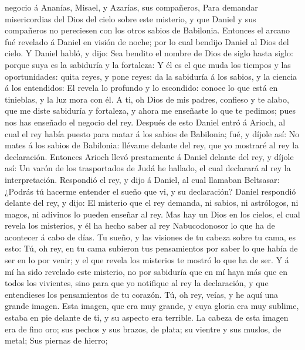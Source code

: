 negocio á Ananías, Misael, y Azarías, sus compañeros, 
Para demandar misericordias del Dios del cielo sobre este misterio, y
que Daniel y sus compañeros no pereciesen con los otros sabios de
Babilonia.  Entonces el arcano fué revelado á Daniel en
visión de noche; por lo cual bendijo Daniel al Dios del cielo.
 Y Daniel habló, y dijo: Sea bendito el nombre de Dios de
siglo hasta siglo: porque suya es la sabiduría y la fortaleza:
 Y él es el que muda los tiempos y las oportunidades:
quita reyes, y pone reyes: da la sabiduría á los sabios, y la ciencia á
los entendidos:  El revela lo profundo y lo escondido:
conoce lo que está en tinieblas, y la luz mora con él.  A
ti, oh Dios de mis padres, confieso y te alabo, que me diste sabiduría y
fortaleza, y ahora me enseñaste lo que te pedimos; pues nos has enseñado
el negocio del rey.  Después de esto Daniel entró á
Arioch, al cual el rey había puesto para matar á los sabios de
Babilonia; fué, y díjole así: No mates á los sabios de Babilonia:
llévame delante del rey, que yo mostraré al rey la declaración.
 Entonces Arioch llevó prestamente á Daniel delante del
rey, y díjole así: Un varón de los trasportados de Judá he hallado, el
cual declarará al rey la interpretación.  Respondió el
rey, y dijo á Daniel, al cual llamaban Beltsasar: ¿Podrás tú hacerme
entender el sueño que vi, y su declaración?  Daniel
respondió delante del rey, y dijo: El misterio que el rey demanda, ni
sabios, ni astrólogos, ni magos, ni adivinos lo pueden enseñar al rey.
 Mas hay un Dios en los cielos, el cual revela los
misterios, y él ha hecho saber al rey Nabucodonosor lo que ha de
acontecer á cabo de días. Tu sueño, y las visiones de tu cabeza sobre tu
cama, es esto:  Tú, oh rey, en tu cama subieron tus
pensamientos por saber lo que había de ser en lo por venir; y el que
revela los misterios te mostró lo que ha de ser.  Y á mí
ha sido revelado este misterio, no por sabiduría que en mí haya más que
en todos los vivientes, sino para que yo notifique al rey la
declaración, y que entendieses los pensamientos de tu corazón.
 Tú, oh rey, veías, y he aquí una grande imagen. Esta
imagen, que era muy grande, y cuya gloria era muy sublime, estaba en pie
delante de ti, y su aspecto era terrible.  La cabeza de
esta imagen era de fino oro; sus pechos y sus brazos, de plata; su
vientre y sus muslos, de metal;  Sus piernas de hierro;
